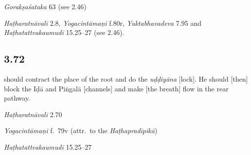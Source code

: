 \begin{ekdosis}
\begin{sources}[hp03_071_1]
\emph{Gorakṣaśataka} 63 (see 2.46)
\end{sources}

\begin{testimonia}[hp03_071_1]
\emph{Haṭharatnāvalī} 2.8, \emph{Yogacintāmaṇī} f.80r, \emph{Yuktabhavadeva} 7.95 and \emph{Haṭhatattvakaumudī} 15.25–27 (see 2.46).

\end{testimonia}



\subsection*{3.72}
\begin{translation} should contract the place of the root  and do the \emph{uḍḍiyāna} [lock]. He should [then] block the Iḍā and Piṅgalā [channels] and make [the breath] flow in the rear pathway.
\end{translation}


\begin{testimonia}[hp03_072]
\emph{Haṭharatnāvalī} 2.70
\begin{versinnote}
\end{versinnote}

\emph{Yogacintāmaṇi} f.~79v (attr.~to the \emph{Haṭhapradīpikā})
\begin{versinnote}
\end{versinnote}

\emph{Haṭhatattvakaumudī} 15.25–27
\begin{versinnote}
\end{versinnote}
\end{testimonia}



\end{ekdosis}
